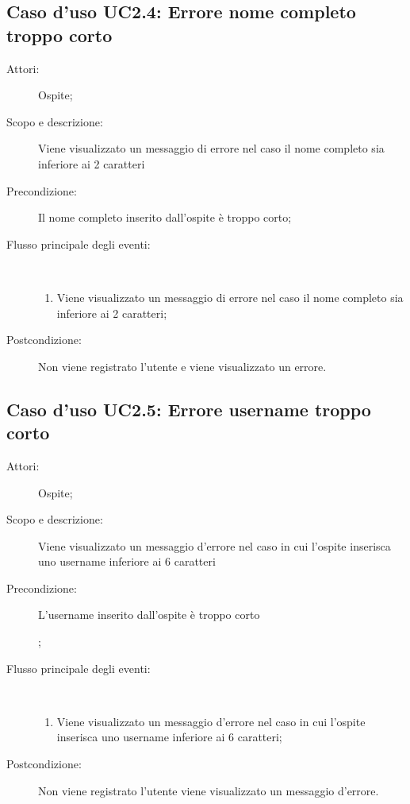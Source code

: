 \subsection{Caso d'uso UC2.4: Errore nome completo troppo corto}\begin{description}
	\item[Attori:] Ospite;
	\item[Scopo e descrizione:] Viene visualizzato un messaggio di errore nel caso il nome completo sia inferiore ai 2 caratteri
	\item[Precondizione:] Il nome completo inserito dall'ospite è troppo corto;
	
	\item[Flusso principale degli eventi:] \ 
	\begin{enumerate}
		\item Viene visualizzato un messaggio di errore nel caso il nome completo sia inferiore ai 2 caratteri;
		
	\end{enumerate}
	\item[Postcondizione:] Non viene registrato l'utente e viene visualizzato un errore.
\end{description}
\hypertarget{UC2.5}{}
\subsection{Caso d'uso UC2.5: Errore username troppo corto}\begin{description}
	\item[Attori:] Ospite;
	\item[Scopo e descrizione:] Viene visualizzato un messaggio d'errore nel caso in cui l'ospite inserisca uno username inferiore ai 6 caratteri
	\item[Precondizione:] L'username inserito dall'ospite è troppo corto
	
	;
	
	\item[Flusso principale degli eventi:] \ 
	\begin{enumerate}
		\item Viene visualizzato un messaggio d'errore nel caso in cui l'ospite inserisca uno username inferiore ai 6 caratteri;
		
	\end{enumerate}
	\item[Postcondizione:] Non viene registrato l'utente viene visualizzato un messaggio d'errore.
\end{description}
\hypertarget{UC2.6}{}
